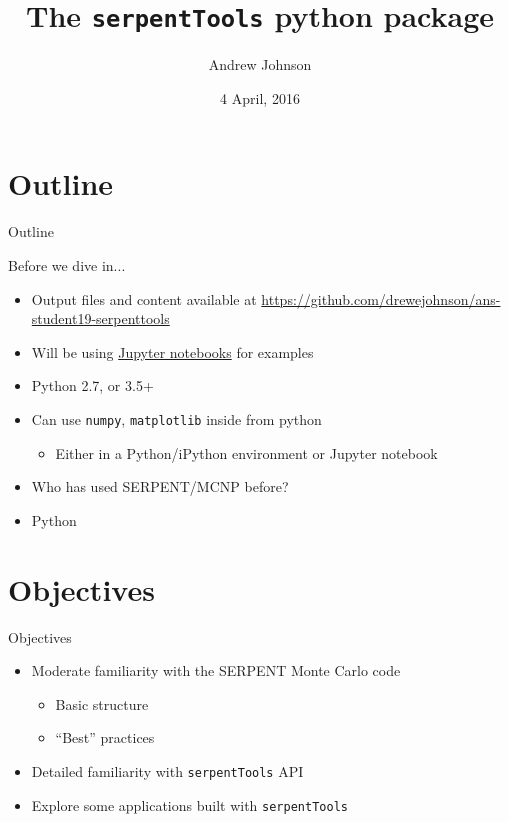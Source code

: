 \documentclass{beamer}
\title{The \texttt{serpentTools} python package}
\author{Andrew Johnson}
\date{4 April, 2016}
\newcommand{\st}{\texttt{serpentTools} }
\begin{document}
\begin{frame}
\titlepage
\end{frame}

\section*{Outline}
\begin{frame}{Outline}
    \begin{multicols}{2}
        \tableofcontents[hideallsubsections]
    \end{multicols}
\end{frame}

\begin{frame}{Before we dive in...}
    \begin{itemize}
        \item{Output files and content available at \url{https://github.com/drewejohnson/ans-student19-serpenttools}}
        \item Will be using \href{https://jupyter.org/}{Jupyter notebooks} for examples
        \item Python 2.7, or 3.5+
        \item Can use \texttt{numpy}, \texttt{matplotlib} inside from python
            \begin{itemize}
                \item Either in a Python/iPython environment or Jupyter notebook
            \end{itemize}
        \item{Who has used SERPENT/MCNP before?}
        \item{Python}
    \end{itemize}
\end{frame}

\section{Objectives}

\begin{frame}{Objectives}
    \begin{itemize}
        \item Moderate familiarity with the SERPENT Monte Carlo code
        \begin{itemize}
            \item Basic structure
            \item ``Best'' practices
        \end{itemize}
        \item Detailed familiarity with \st API
        \item Explore some applications built with \st
    \end{itemize}
\end{frame}
\end{document}

